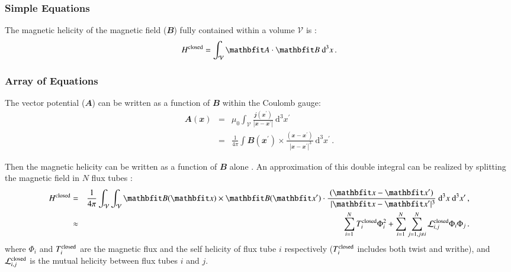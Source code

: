 \documentclass[namedreferences]{solarphysics}
\renewcommand{\vec}[1]{{\mathbfit #1}}
\newcommand{\vol}{ {\mathcal V} }
\newcommand{\dv}{~{\mathrm d}^3 x}
\newcommand{\intv}{\int_{\vol}^{}}
\newcommand{\avec}{ \vec A}
\newcommand{\bb}{\vec B}
\newcommand{\jj}{ \vec j}
\newcommand{\xx}{ \vec x}
\begin{document}
\begin{article}
{  
\subsubsection{Simple Equations} %
  \label{S-simple-equations}
 The magnetic helicity of the magnetic field ($\vec{B}$) fully contained 
within a volume $\vol $ is \cite{Elsasser56}:
   \begin{equation}  \label{Eq-H-def}
     H^{\rm closed} = \intv \avec \cdot \bb \dv \,.
   \end{equation}

\subsubsection{Array of Equations} %
  \label{S-array-equations}
The vector potential ($\avec$) can be written as a function of $\bb$
within the Coulomb gauge:
   \begin{eqnarray}   
     \avec (\xx) &=& \mu_{0}\intv \frac{\jj (\xx  ^\prime)}
                     { | \xx - \xx  ^\prime |} \dv ^\prime          
                       \nonumber \\      %
                 &=& \frac{1}{4\pi} \int \bb (\xx ^\prime ) \times
                     \frac{(\xx  - \xx ^\prime)}{\,\, |\xx - \xx ^\prime |^3}  
                                           \dv ^\prime   \,. 
                       \label{Eq-A-B}    %
   \end{eqnarray}

Then the magnetic helicity can be written as a function of $\bb$
alone \cite{Moffatt69}. An approximation of this double integral 
can be realized by splitting
the magnetic field in $N$ flux tubes \cite{BergerF84}:
   \begin{eqnarray}   
    H^{\rm closed} &=& \frac{1}{4\pi} \intv \intv
                      \bb (\xx ) \times \bb (\xx ^\prime )
                      \cdot \frac{(\xx  - \xx ^\prime)}{\,\, |\xx - \xx ^\prime |^3}
                      \dv \dv ^\prime \,,                     \label{Eq-H-B} \\      
                  &\approx & \sum_{i=1}^N T_i^{\rm closed} \Phi_i^2
                           + \sum_{i=1}^N \sum_{j=1,j \neq i}^N
                             {\mathcal L}^{\rm closed}_{i,j} \Phi_i \Phi_j  \,.
                       \label{Eq-H-N}     %
   \end{eqnarray}
where $\Phi_i$ and $T_i^{\rm closed}$ are the magnetic flux and the
self helicity of flux tube $i$ respectively ($T_i^{\rm closed}$
includes both twist and writhe), and ${\mathcal L}^{\rm
closed}_{i,j}$ is the mutual helicity between flux tubes $i$ and
$j$.

}
\end{article}
\end{document}

